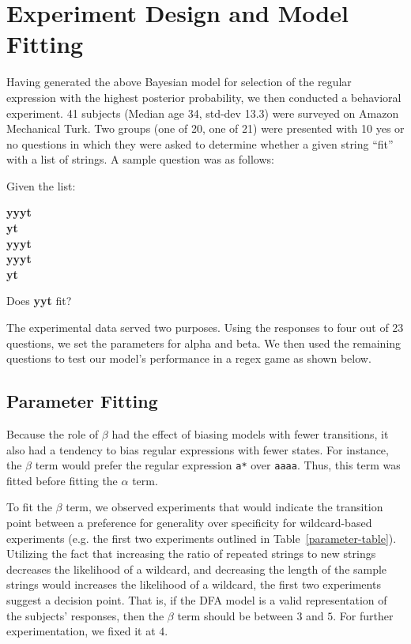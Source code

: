 \documentclass[10pt,letterpaper]{article}
\begin{document}
\section{Experiment Design and Model Fitting}
Having generated the above Bayesian model for selection of the regular expression with the highest posterior probability, we then conducted a behavioral experiment.  41 subjects (Median age 34, std-dev 13.3) were surveyed on Amazon Mechanical Turk. Two groups (one of 20, one of 21) were presented with 10 yes or no questions in which they were asked to determine whether a given string ``fit'' with a list of strings. A sample question was as follows:
\begin{center}Given the list:

\textbf{yyyt \\
yt \\
yyyt \\
yyyt \\ 
yt}

Does \textbf{yyt} fit?
\end{center}

The experimental data served two purposes. Using the responses to four out of 23 questions, we set the parameters for alpha and beta. We then used the remaining questions to test our model's performance in a regex game as shown below. 

\subsection{Parameter Fitting}
Because the role of $\beta$ had the effect of biasing models with fewer transitions, it also had a tendency to bias regular expressions with fewer states. For instance, the $\beta$ term would prefer the regular expression \verb!a*! over \verb!aaaa!. Thus, this term was fitted before fitting the $\alpha$ term.

To fit the $\beta$ term, we observed experiments that would indicate the transition point between a preference for generality over specificity for wildcard-based experiments (e.g. the first two experiments outlined in Table~\ref{parameter-table}). Utilizing the fact that increasing the ratio of repeated strings to new strings decreases the likelihood of a wildcard, and decreasing the length of the sample strings would increases the likelihood of a wildcard, the first two experiments suggest a decision point. That is, if the DFA model is a valid representation of the subjects' responses, then the $\beta$ term should be between $3$ and $5$. For further experimentation, we fixed it at $4$.
\end{document}
